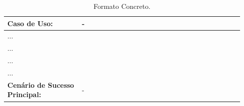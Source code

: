 \documentclass[a4paper, 12pt]{article}
\begin{document}
	\begin{table}[H]
		\centering
		\begin{tabular}{p{0.3\linewidth}  p{0.65\linewidth}}
			\toprule
			
			\textbf{Caso de Uso:} & -\\ \midrule
			$\dots$ &  \\ \midrule
			$\dots$ &  \\ \midrule
			$\dots$  \\ \midrule
			$\dots$&  \\ \midrule
			\textbf{Cenário de Sucesso Principal:} & -  \\ 
			
			\bottomrule
		\end{tabular}
		\caption{ {\small Formato Concreto.}}
	\end{table}
	
	
\end{document}
